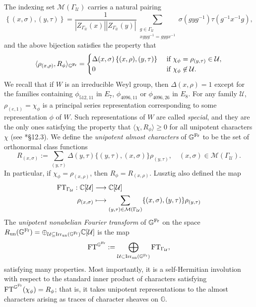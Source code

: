 The indexing set $\mathcal{M}(\Gamma_\mathcal{U})$ carries a natural pairing 
$$\left\{(x,\sigma),(y,\tau)\right\}=\frac{1}{|Z_{\Gamma_\mathcal{U}}(x)||Z_{\Gamma_\mathcal{U}}(y)|}\sum_{\substack{g\in\Gamma_{\mathcal{U}}\\xgyg^{-1}=gygx^{-1}}}\sigma(gyg^{-1})\tau(g^{-1}x^{-1}g),$$
and the above bijection satisfies the property that 
\begin{equation}\label{eqn:inner_product}
    \langle\rho_{(x,\rho)},R_\phi\rangle_{\mathbb{G}^{\mathrm{Fr}}}=\begin{cases}
        \Delta(x,\sigma)\left\{(x,\rho),(y,\tau)\right\}&\text{ if }\chi_\phi=\rho_{(y,\tau)}\in\mathcal{U},\\
        0 & \text{ if }\chi_\phi\not\in\mathcal{U}.
    \end{cases}
\end{equation}
We recall that if $W$ is an irreducible Weyl group, then $\Delta(x,\rho)=1$ except for the families containing $\phi_{512,11}$ in $E_7$, $\phi_{4096,11}$ or $\phi_{4096,26}$ in $E_8$. For any family $\mathcal{U}$, $\rho_{(e,1)}=\chi_\phi$ is a principal series representation corresponding to some representation $\phi$ of $W$. Such representations of $W$ are called \textit{special}, and they are the only ones satisfying the property that $\langle\chi,R_\phi\rangle\geq0$ for all unipotent characters $\chi$ (see \cite{Carter1985}*{\S12.3}). We define the \textit{unipotent almost characters} of $\mathbb{G}^{\mathrm{Fr}}$ to be the set of orthonormal class functions
$$R_{(x,\sigma)}:=\sum_{(y,\tau)}\Delta(y,\tau)\{(y,\tau),(x,\sigma)\}\rho_{(y,\tau)},\quad(x,\sigma)\in\mathcal{M}(\Gamma_\mathcal{U}).$$
In particular, if $\chi_\phi=\rho_{(x,\rho)}$, then $R_\phi=R_{(x,\rho)}$. Lusztig also defined the map 
\begin{align*}
    \mathrm{FT}_{\Gamma_\mathcal{U}}:\mathbb{C}[\mathcal{U}]&\longrightarrow\mathbb{C}[\mathcal{U}]\\
    \rho_{(x,\sigma)}&\longmapsto\sum_{(y,\tau)\in\mathcal{M}(\Gamma_\mathcal{U})}\{(x,\sigma),(y,\tau)\}\rho_{(y,\tau)}
\end{align*}
The \textit{unipotent nonabelian Fourier transform} of $\mathbb{G}^{\mathrm{Fr}}$ on the space $R_{\mathrm{un}}(\mathbb{G}^{\mathrm{Fr}})=\oplus_{\mathcal{U}\subseteq\mathrm{Irr}_{\mathrm{un}}(\mathbb{G}^{\mathrm{Fr}})}\mathbb{C}[\mathcal{U}]$ is the map
$$\mathrm{FT}^{\mathbb{G}^{\mathrm{Fr}}}:=\bigoplus_{\mathcal{U}\subset\mathrm{Irr}_{\mathrm{un}}(\mathbb{G}^{\mathrm{Fr}})}\mathrm{FT}_{\Gamma_\mathcal{U}},$$
satisfying many properties. Most importantly, it is a self-Hermitian involution with respect to the standard inner product of characters satisfying $\mathrm{FT}^{\mathbb{G}^{\mathrm{Fr}}}(\chi_\phi)=R_\phi$; that is, it takes unipotent representations to the almost characters arising as traces of character sheaves on $\mathbb{G}$.


